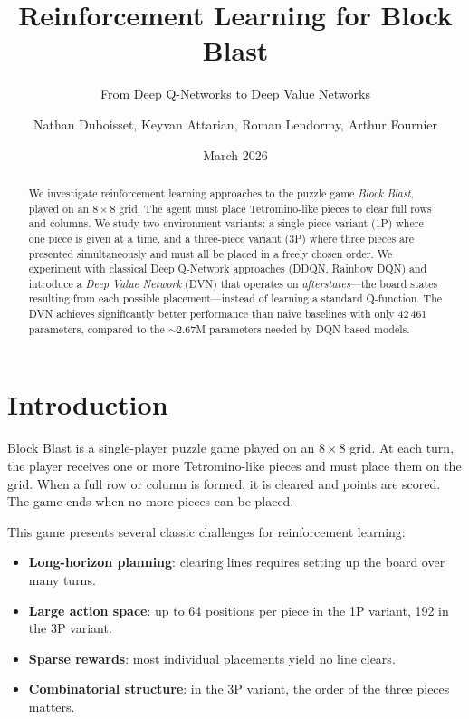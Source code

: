 \documentclass[10pt]{article}
\author{Nathan Duboisset, Keyvan Attarian, Roman Lendormy, Arthur Fournier}
\date{March 2026}
\title{Reinforcement Learning for Block Blast}
\subtitle{From Deep Q-Networks to Deep Value Networks}
\begin{document}
\maketitle
\newpage

\tableofcontents
\newpage

\begin{abstract}
We investigate reinforcement learning approaches to the puzzle game \emph{Block Blast}, played on an $8\times8$ grid. The agent must place Tetromino-like pieces to clear full rows and columns. We study two environment variants: a single-piece variant (1P) where one piece is given at a time, and a three-piece variant (3P) where three pieces are presented simultaneously and must all be placed in a freely chosen order. We experiment with classical Deep Q-Network approaches (DDQN, Rainbow DQN) and introduce a \emph{Deep Value Network} (DVN) that operates on \emph{afterstates}---the board states resulting from each possible placement---instead of learning a standard Q-function. The DVN achieves significantly better performance than naive baselines with only 42\,461 parameters, compared to the $\sim$2.67M parameters needed by DQN-based models.
\end{abstract}

\section{Introduction}

Block Blast is a single-player puzzle game played on an $8\times8$ grid. At each turn, the player receives one or more Tetromino-like pieces and must place them on the grid. When a full row or column is formed, it is cleared and points are scored. The game ends when no more pieces can be placed.

This game presents several classic challenges for reinforcement learning:
\begin{itemize}
    \item \textbf{Long-horizon planning}: clearing lines requires setting up the board over many turns.
    \item \textbf{Large action space}: up to 64 positions per piece in the 1P variant, 192 in the 3P variant.
    \item \textbf{Sparse rewards}: most individual placements yield no line clears.
    \item \textbf{Combinatorial structure}: in the 3P variant, the order of the three pieces matters.
\end{itemize}
\end{document}
